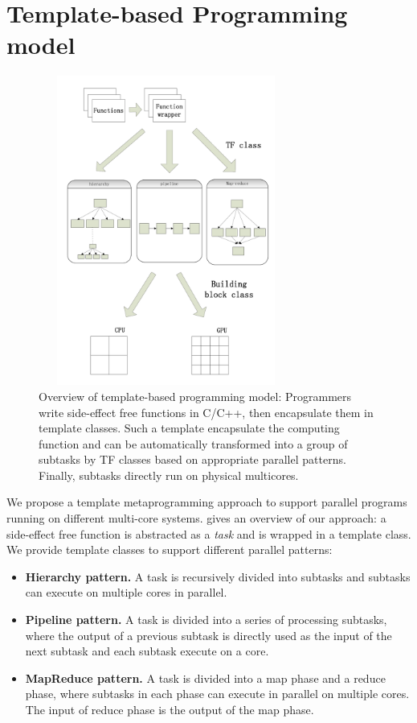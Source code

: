 \section{Template-based Programming model}
\label{sec:model}

\begin{figure}[htb]
\includegraphics[width=3.3in, height=4.0in]{../overview}
\caption{Overview of template-based programming model: Programmers
write side-effect free functions in C/C++, then encapsulate them in
template classes. Such a template encapsulate the computing function and can be 
automatically transformed into a
group of subtasks by TF classes based on appropriate parallel patterns. Finally,
subtasks directly run on physical multicores.}
\label{fig:overview}
\end{figure}

We propose a template metaprogramming approach to support parallel programs
running on different multi-core systems.  gives an overview
of our approach: a side-effect free function is abstracted as a \emph{task}
and is wrapped in a template class. We provide template classes
to support different parallel patterns:

\begin{itemize}
\item \textbf{Hierarchy pattern.} A task is recursively divided into subtasks
and subtasks can execute on multiple cores in parallel.

\item \textbf{Pipeline pattern.} A task is divided into a series of processing
subtasks, where the output of a previous subtask is directly used as the input
of the next subtask and each subtask execute on a core.

\item \textbf{MapReduce pattern.} A task is divided into a map phase and a
reduce phase, where subtasks in each phase can execute in parallel on multiple
cores. The input of reduce phase is the output of the map phase.

\end{itemize}

